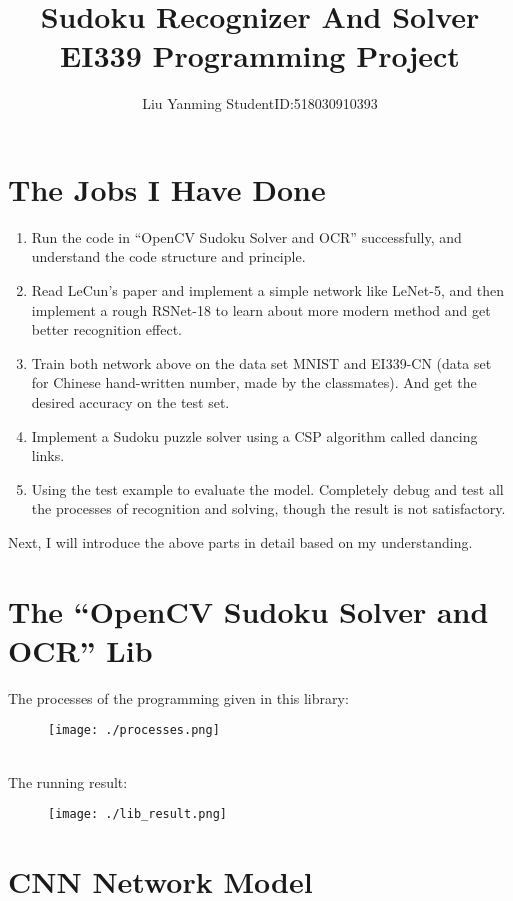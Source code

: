 \documentclass{article}
\title{Sudoku Recognizer And Solver\\EI339 Programming Project}
\author{Liu Yanming StudentID:518030910393}
\begin{document}
\maketitle

\section{The Jobs I Have Done}
\begin{enumerate}
    \item Run the code in ``OpenCV Sudoku Solver and OCR'' successfully, and understand the code structure and principle.
    \item Read LeCun's paper and implement a simple network like LeNet-5, and then implement a rough RSNet-18 to learn about more modern method and get better recognition effect.
    \item Train both network above on the data set MNIST and EI339-CN (data set for Chinese hand-written number, made by the classmates). And get the desired accuracy on the test set.
    \item Implement a Sudoku puzzle solver using a CSP algorithm called dancing links.
    \item Using the test example to evaluate the model. Completely debug and test all the processes of recognition and solving, though the result is not satisfactory.
\end{enumerate}
Next, I will introduce the above parts in detail based on my understanding.

\section{The ``OpenCV Sudoku Solver and OCR'' Lib}
The processes of the programming given in this library:
\begin{figure}[htb]
\centering
\texttt{[image: ./processes.png]}
\end{figure}~\\
The running result:
\begin{figure}[htb]
\centering
\texttt{[image: ./lib\_result.png]}
\end{figure}

\section{CNN Network Model}
\end{document}
